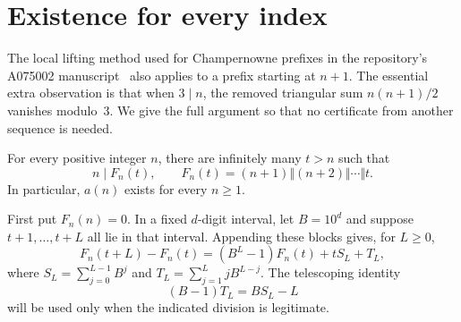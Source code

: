 \section{Existence for every index}\label{sec:existence}
The local lifting method used for Champernowne prefixes in the repository's
A075002 manuscript~\cite{prefix} also applies to a prefix starting at $n+1$.
The essential extra observation is that when $3\mid n$, the removed
triangular sum $n(n+1)/2$ vanishes modulo~3. We give the full argument
so that no certificate from another sequence is needed.

\begin{theorem}\label{thm:existence}
For every positive integer $n$, there are infinitely many $t>n$ such that
\[
 n\mid F_n(t),\qquad F_n(t)=(n+1)\Vert(n+2)\Vert\cdots\Vert t.
\]
In particular, $a(n)$ exists for every $n\ge1$.
\end{theorem}

First put $F_n(n)=0$. In a fixed $d$-digit interval, let $B=10^d$ and
suppose $t+1,\ldots,t+L$ all lie in that interval. Appending these blocks
gives, for $L\ge0$,
\begin{equation}\label{eq:shift}
 F_n(t+L)-F_n(t)=(B^L-1)F_n(t)+tS_L+T_L,
\end{equation}
where $S_L=\sum_{j=0}^{L-1}B^j$ and
$T_L=\sum_{j=1}^L jB^{L-j}$. The telescoping identity
\begin{equation}\label{eq:weighted}
 (B-1)T_L=BS_L-L
\end{equation}
will be used only when the indicated division is legitimate.

